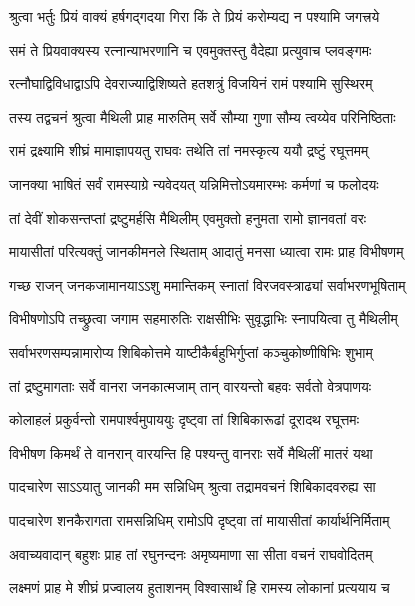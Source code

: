 \twolineshloka
{श्रुत्वा भर्तुः प्रियं वाक्यं हर्षगद्गदया गिरा}
{किं ते प्रियं करोम्यद्य न पश्यामि जगत्त्रये} %

\twolineshloka
{समं ते प्रियवाक्यस्य रत्नान्याभरणानि च}
{एवमुक्तस्तु वैदेह्या प्रत्युवाच प्लवङ्गमः} %

\twolineshloka
{रत्नौघाद्विविधाद्वाऽपि देवराज्याद्विशिष्यते}
{हतशत्रुं विजयिनं रामं पश्यामि सुस्थिरम्} %

\twolineshloka
{तस्य तद्वचनं श्रुत्वा मैथिली प्राह मारुतिम्}
{सर्वे सौम्या गुणा सौम्य त्वय्येव परिनिष्ठिताः} %

\twolineshloka
{रामं द्रक्ष्यामि शीघ्रं मामाज्ञापयतु राघवः}
{तथेति तां नमस्कृत्य ययौ द्रष्टुं रघूत्तमम्} %

\twolineshloka
{जानक्या भाषितं सर्वं रामस्याग्रे न्यवेदयत्}
{यन्निमित्तोऽयमारम्भः कर्मणां च फलोदयः} %

\twolineshloka
{तां देवीं शोकसन्तप्तां द्रष्टुमर्हसि मैथिलीम्}
{एवमुक्तो हनुमता रामो ज्ञानवतां वरः} %

\twolineshloka
{मायासीतां परित्यक्तुं जानकीमनले स्थिताम्}
{आदातुं मनसा ध्यात्वा रामः प्राह विभीषणम्} %

\twolineshloka
{गच्छ राजन् जनकजामानयाऽऽशु ममान्तिकम्}
{स्नातां विरजवस्त्राढ्यां सर्वाभरणभूषिताम्} %

\twolineshloka
{विभीषणोऽपि तच्छ्रुत्वा जगाम सहमारुतिः}
{राक्षसीभिः सुवृद्धाभिः स्नापयित्वा तु मैथिलीम्} %

\twolineshloka
{सर्वाभरणसम्पन्नामारोप्य शिबिकोत्तमे}
{याष्टीकैर्बहुभिर्गुप्तां कञ्चुकोष्णीषिभिः शुभाम्} %

\twolineshloka
{तां द्रष्टुमागताः सर्वे वानरा जनकात्मजाम्}
{तान् वारयन्तो बहवः सर्वतो वेत्रपाणयः} %

\twolineshloka
{कोलाहलं प्रकुर्वन्तो रामपार्श्वमुपाययुः}
{दृष्ट्वा तां शिबिकारूढां दूरादथ रघूत्तमः} %

\twolineshloka
{विभीषण किमर्थं ते वानरान् वारयन्ति हि}
{पश्यन्तु वानराः सर्वे मैथिलीं मातरं यथा} %

\twolineshloka
{पादचारेण साऽऽयातु जानकी मम सन्निधिम्}
{श्रुत्वा तद्रामवचनं शिबिकादवरुह्य सा} %

\twolineshloka
{पादचारेण शनकैरागता रामसन्निधिम्}
{रामोऽपि दृष्ट्वा तां मायासीतां कार्यार्थनिर्मिताम्} %

\twolineshloka
{अवाच्यवादान् बहुशः प्राह तां रघुनन्दनः}
{अमृष्यमाणा सा सीता वचनं राघवोदितम्} %

\twolineshloka
{लक्ष्मणं प्राह मे शीघ्रं प्रज्वालय हुताशनम्}
{विश्वासार्थं हि रामस्य लोकानां प्रत्ययाय च} %

